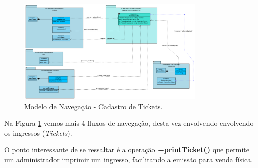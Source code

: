 \begin{figure}[h]
	\centering
	\includegraphics[width=0.8\textwidth]{figuras/ModeloNavegacaoTicket.PNG}
	\caption{Modelo de Navegação - Cadastro de Tickets.}
	\label{figura-cadastrotickets}
\end{figure}

Na Figura \ref{figura-cadastrotickets} vemos mais 4 fluxos de navegação, desta vez envolvendo envolvendo os ingressos (\textit{Tickets}).

O ponto interessante de se ressaltar é a operação \textbf{+printTicket()} que permite um administrador imprimir um ingresso, facilitando a emissão para venda física.